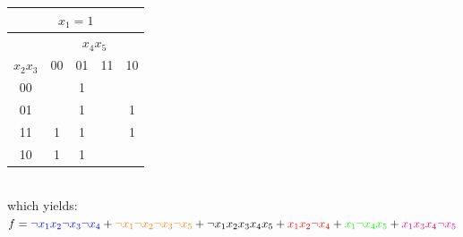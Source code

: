 \documentclass[10pt,a4paper]{scrartcl}
\begin{document}

\begin{tabular}{|c||c|c|c|c|}
  \hline
  \multicolumn{5}{|c|}{$x_1=1$} \\ \hline
            & \multicolumn{4}{c|}{$x_4x_5$} \\
$x_2x_3$ & 00                  & 01                  & 11                 & 10                  \\ \hline\hline
    00   &                     & \cellcolor{green}1  &                    &                     \\ \hline
    01   &                     & \cellcolor{green}1  &                    & \cellcolor{magenta}1\\ \hline
    11   & \cellcolor{red}1    & \cellcolor{yellow}1 &                    & \cellcolor{magenta}1\\ \hline
    10   & \cellcolor{red}1    & \cellcolor{yellow}1 &                    &                     \\
  \hline
\end{tabular}\\[5mm]
which yields: $f   =  \textcolor{blue}{\neg x_1x_2\neg x_3\neg x_4}+
                      \textcolor{orange}{\neg x_1\neg x_2\neg x_3\neg x_5}+
                      \neg x_1x_2x_3x_4x_5+
                      \textcolor{red}{x_1x_2\neg x_4}+
                      \textcolor{green}{x_1\neg x_4x_5}+
                      \textcolor{magenta}{x_1x_3x_4\neg x_5}$\\
\end{document}

